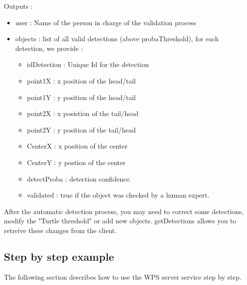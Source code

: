 \documentclass{article}
\begin{document}
	Outputs :
	\begin{itemize}
	 \item user : Name of the person in charge of the validation process 
     \item objects : list of all valid detections (above probaThreshold), for each detection, we provide :
   	 	\begin{itemize}
    		\item idDetection : Unique Id for the detection
    		\item point1X : x position of the head/tail
    		\item point1Y : y position of the head/tail
    		\item point2X : x posistion of the tail/head
    		\item point2Y : y position of the tail/head
    		\item CenterX : x position of the center
    		\item CenterY : y postion of the center
    		\item detectProba : detection confidence.
    		\item validated : true if the object was checked by a human expert.	
    	\end{itemize}
    \end{itemize}

After the automatic detection process, you may need to correct some detections, modify the "Turtle threshold" or add new objects. getDetections allows you to retreive these changes from the client.
 \subsection{Step by step example}
 The following section describes how to use the WPS server service step by step. 
 
\end{document}
